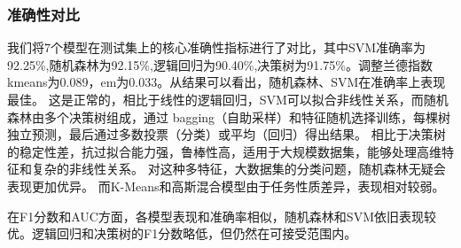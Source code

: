 \documentclass{SYSUReport}
\begin{document}
\subsubsection{准确性对比}
我们将7个模型在测试集上的核心准确性指标进行了对比，其中SVM准确率为92.25\%,随机森林为92.15\%,逻辑回归为90.40\%,决策树为91.75\%。调整兰德指数kmeans为0.089，em为0.033。从结果可以看出，随机森林、SVM在准确率上表现最佳。
这是正常的，相比于线性的逻辑回归，SVM可以拟合非线性关系，而随机森林由多个决策树组成，通过 bagging（自助采样）和特征随机选择训练，每棵树独立预测，最后通过多数投票（分类）或平均（回归）得出结果。
相比于决策树的稳定性差，抗过拟合能力强，鲁棒性高，适用于大规模数据集，能够处理高维特征和复杂的非线性关系。
对这种多特征，大数据集的分类问题，随机森林无疑会表现更加优异。
而K-Means和高斯混合模型由于任务性质差异，表现相对较弱。

在F1分数和AUC方面，各模型表现和准确率相似，随机森林和SVM依旧表现较优。逻辑回归和决策树的F1分数略低，但仍然在可接受范围内。

\begin{table}[!htbp]
    \centering
    \caption{各监督学习模型准确性指标对比}
    \label{tab:accuracy}
\end{table}

\begin{table}[!htbp]
    \centering
    \caption{各模型效率与聚类性能指标对比}
    \label{tab:efficiency}
\end{table}
\end{document}
